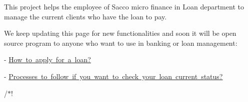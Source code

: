 
\begin{DoxyItemize}
\item This project helps the employee of Sacco micro finance in Loan department to manage the current clients who have the loan to pay.
\item We keep updating this page for new functionalities and soon it will be open source program to anyone who want to use in banking or loan management\+:
\item -\/ \mbox{\hyperlink{_apply_loan_page}{How to apply for a loan?}}
\item -\/ \mbox{\hyperlink{_loan_status_page}{Processes to follow if you want to check your loan current status?}}
\end{DoxyItemize}

/$\ast$! 